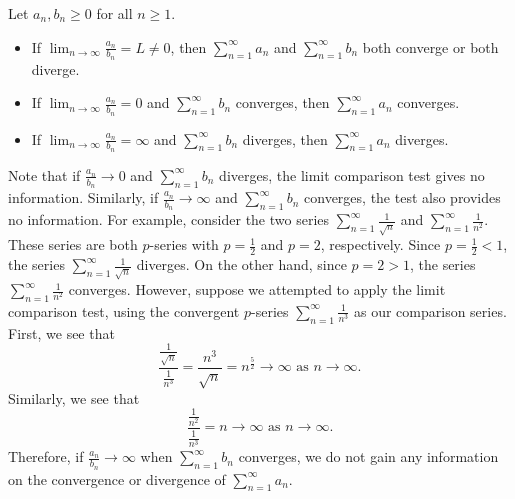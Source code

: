 \documentclass{report}
\begin{document}
    \bigbreak \noindent 
    \begin{thrm}
     Let \( a_n, b_n \geq 0 \) for all \( n \geq 1 \).
        \begin{itemize}
          \item If \( \lim_{n \to \infty} \frac{a_n}{b_n} = L \neq 0 \), then \( \sum_{n=1}^{\infty} a_n \) and \( \sum_{n=1}^{\infty} b_n \) both converge or both diverge.
          \item If \( \lim_{n \to \infty} \frac{a_n}{b_n} = 0 \) and \( \sum_{n=1}^{\infty} b_n \) converges, then \( \sum_{n=1}^{\infty} a_n \) converges.
          \item If \( \lim_{n \to \infty} \frac{a_n}{b_n} = \infty \) and \( \sum_{n=1}^{\infty} b_n \) diverges, then \( \sum_{n=1}^{\infty} a_n \) diverges.
        \end{itemize}
    \end{thrm}
    \bigbreak \noindent 
    Note that if $\frac{a_n}{b_n} \to 0$ and $\sum_{n=1}^{\infty} b_n$ diverges, the limit comparison test gives no information. Similarly, if $\frac{a_n}{b_n} \to \infty$ and $\sum_{n=1}^{\infty} b_n$ converges, the test also provides no information. For example, consider the two series $\sum_{n=1}^{\infty} \frac{1}{\sqrt{n}}$ and $\sum_{n=1}^{\infty} \frac{1}{n^2}$. These series are both $p$-series with $p=\frac{1}{2}$ and $p=2$, respectively. Since $p=\frac{1}{2} < 1$, the series $\sum_{n=1}^{\infty} \frac{1}{\sqrt{n}}$ diverges. On the other hand, since $p=2 > 1$, the series $\sum_{n=1}^{\infty} \frac{1}{n^2}$ converges. However, suppose we attempted to apply the limit comparison test, using the convergent $p$-series $\sum_{n=1}^{\infty} \frac{1}{n^3}$ as our comparison series. First, we see that
    \bigbreak \noindent 
    \[
    \frac{\frac{1}{\sqrt{n}}}{\frac{1}{n^3}} = \frac{n^3}{\sqrt{n}} = n^{\frac{5}{2}} \to \infty \text{ as } n \to \infty.
    \]
    Similarly, we see that
    \[
    \frac{\frac{1}{n^2}}{\frac{1}{n^3}} = n \to \infty \text{ as } n \to \infty.
    \]
    Therefore, if $\frac{a_n}{b_n} \to \infty$ when $\sum_{n=1}^{\infty} b_n$ converges, we do not gain any information on the convergence or divergence of $\sum_{n=1}^{\infty} a_n$.
\end{document}
